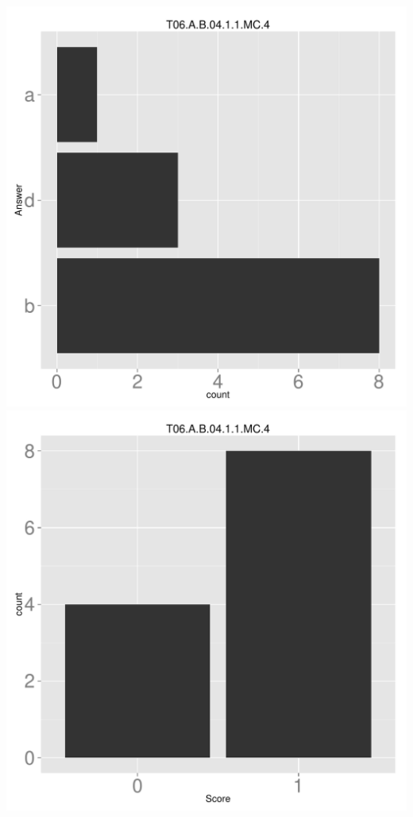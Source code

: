 \documentclass[12pt,english,nohyper]{tufte-handout}\usepackage[]{graphicx}\usepackage[]{color}
\begin{document}
\begin{center} \includegraphics[width=.45\linewidth]{Topic06_AB_8_answer} \includegraphics[width=.45\linewidth]{Topic06_AB_8_score} \end{center} 
\end{document}
